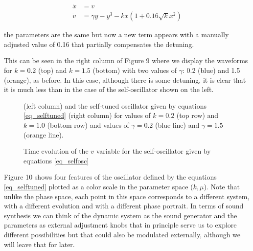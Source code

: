 \documentclass{article}
\begin{document}
\begin{subequations} \label{eq_selftuned}
\begin{align}
    \dot{x} & = v \\
    \dot{v} & = \gamma y - y^3 -kx(1+0.16\sqrt{k}x^2)
\end{align}
\end{subequations}

the parameters are the same but now a new term appears with a manually adjusted value of 0.16 that partially compensates the detuning. 

This can be seen in the right column of Figure 9 where we display the waveforms for $k=0.2$ (top) and $k=1.5$ (bottom) with two values of $\gamma$: 0.2 (blue) and 1.5 (orange), as before. 
In this case, although there is some detuning, it is clear that it is much less than in the case of the self-oscillator shown on the left.

\begin{figure}[h]
    \centering
    \caption{Time evolution of the $v$ variable for the self-oscillator given by equations \ref{eq_selfosc}} (left column) and the self-tuned oscillator given by equations \ref{eq_selftuned} (right column) for values of $k=0.2$ (top row) and $k=1.0$ (bottom row) and values of $\gamma=0.2$ (blue line) and $\gamma=1.5$ (orange line). 
    \label{fig_selftunedosc}
\end{figure}

Figure 10 shows four features of the oscillator defined by the equations \ref{eq_selftuned} plotted as a color scale in the parameter space ($k,\mu$). 
Note that unlike the phase space, each point in this space corresponds to a different system, with a different evolution and with a different phase portrait. 
In terms of sound synthesis we can think of the dynamic system as the sound generator and the parameters as external adjustment knobs that in principle serve us to explore different possibilities but that could also be modulated externally, although we will leave that for later.
\end{document}
